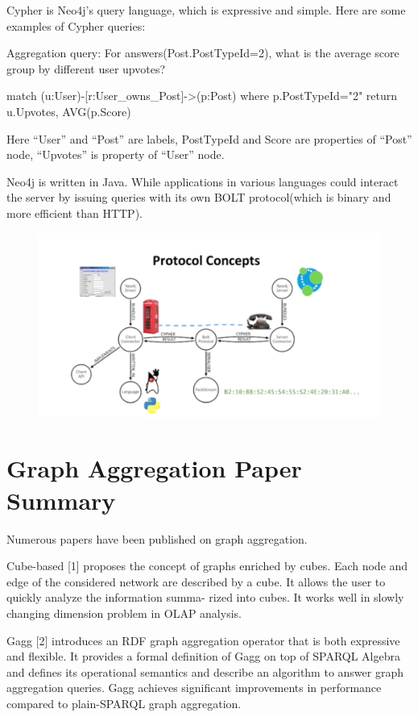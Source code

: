 Cypher is Neo4j’s query language, which is expressive and simple. Here are some examples of Cypher queries:

Aggregation query: For answers(Post.PostTypeId=2), what is the average score group by different user upvotes?
 
match (u:User)-[r:User\_owns\_Post]->(p:Post) where p.PostTypeId="2" return u.Upvotes, AVG(p.Score)
 
Here “User” and “Post” are labels, PostTypeId and Score are properties of “Post” node, “Upvotes” is property of “User” node.
 
Neo4j is written in Java. While applications in various languages could interact the server by issuing queries with its own BOLT protocol(which is binary and more efficient than HTTP).  

\begin {figure}[H]
\centering
\includegraphics[scale=0.4]{pic/23.png}
\end{figure}


\section{Graph Aggregation Paper Summary}

Numerous papers have been published on graph aggregation. 

Cube-based [1] proposes the concept of  graphs enriched by cubes. Each node and edge of the considered network are described by a cube. It allows the user to quickly analyze the information summa-
rized into cubes. It works well in slowly changing dimension problem in OLAP analysis.

Gagg [2] introduces an RDF graph aggregation operator that is both expressive and flexible. It provides a formal definition of Gagg on top of SPARQL Algebra and defines its operational semantics and describe an algorithm to answer graph aggregation queries. Gagg achieves significant improvements in performance compared to plain-SPARQL graph aggregation.

